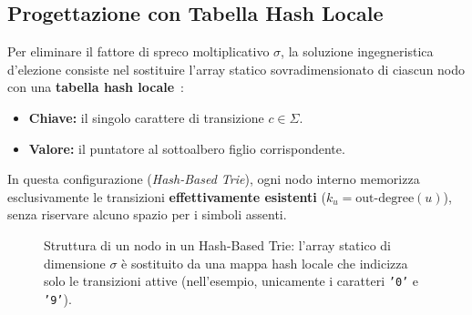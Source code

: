 \FloatBarrier
\subsection{Progettazione con Tabella Hash Locale}
\label{subsec:progettazione-hash-trie}

Per eliminare il fattore di spreco moltiplicativo $\sigma$, la soluzione ingegneristica d'elezione consiste nel sostituire l'array statico sovradimensionato di ciascun nodo con una \textbf{tabella hash locale}~\cite{knuth1998vol3}:
\begin{itemize}
  \item \textbf{Chiave:} il singolo carattere di transizione $c \in \Sigma$.
  \item \textbf{Valore:} il puntatore al sottoalbero figlio corrispondente.
\end{itemize}

In questa configurazione (\textit{Hash-Based Trie}), ogni nodo interno memorizza esclusivamente le transizioni \textbf{effettivamente esistenti} ($k_u = \text{out-degree}(u)$), senza riservare alcuno spazio per i simboli assenti. 

\begin{figure}[H]
\centering
{}
\caption{Struttura di un nodo in un Hash-Based Trie: l'array statico di dimensione $\sigma$ \`e sostituito da una mappa hash locale che indicizza solo le transizioni attive (nell'esempio, unicamente i caratteri \texttt{'0'} e \texttt{'9'}).}
\label{fig:hash-based-node}
\end{figure}

